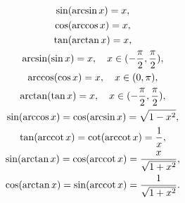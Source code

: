 \begin{theorem}[三角关系]
\begin{gather}
	\sin(\arcsin{x}) = x, \\
	\cos(\arccos{x}) = x, \\
	\tan(\arctan{x}) = x, \\
	\arcsin(\sin x) = x, \quad x \in (-\frac{\pi}{2},\frac{\pi}{2}), \\
	\arccos(\cos x) = x, \quad x \in (0,\pi), \\
	\arctan(\tan x) = x, \quad x \in (-\frac{\pi}{2},\frac{\pi}{2}), \\
	\sin(\arccos{x}) = \cos(\arcsin{x}) = \sqrt{1 - x^2}, \\
	\tan(\arccot{x}) = \cot(\arccot{x}) = \frac{1}{x}, \\
	\sin(\arctan{x}) = \cos(\arccot{x}) = \frac{x}{\sqrt{1+x^2}}, \\
	\cos(\arctan{x}) = \sin(\arccot{x}) = \frac{1}{\sqrt{1+x^2}}.
\end{gather}
\end{theorem}

